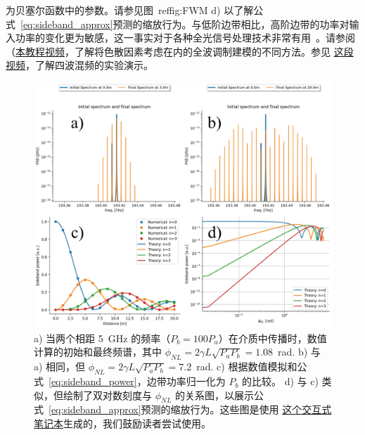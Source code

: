 为贝塞尔函数中的参数。请参见图~ref{fig:FWM} d) 以了解公式~\ref{eq:sideband_approx}预测的缩放行为。与低阶边带相比，高阶边带的功率对输入功率的变化更为敏感，这一事实对于各种全光信号处理技术非常有用~\cite{my_thesis,BenoitPhD,YangLuPhD}。请参阅（\href{https://youtu.be/0SXPvO89jto}{本教程视频}，了解将色散因素考虑在内的全波调制建模的不同方法。参见 \href{https://youtu.be/gsa9hrCbnqI}{这段视频}，了解四波混频的实验演示。
\begin{figure}
    \centering
    \includegraphics[width=1.0\linewidth]{figures/FWM_combined.png}
    \caption{a) 当两个相距 5~GHz 的频率（$P_b=100P_a$）在介质中传播时，数值计算的初始和最终频谱，其中 $\phi_{NL}=2\gamma L\sqrt{P_aP_b}=1.08$~rad. b) 与 a) 相同，但 $\phi_{NL}=2\gamma L\sqrt{P_aP_b}=7.2$~rad. c) 根据数值模拟和公式~\ref{eq:sideband_power}，边带功率归一化为 $P_b$ 的比较。 d) 与 c) 类似，但绘制了双对数刻度与 $\phi_{NL}$ 的关系图，以展示公式~\ref{eq:sideband_approx}预测的缩放行为。这些图是使用 \href{https://colab.research.google.com/drive/1l054EDg-50aK5GORN_md4_-tlFy4jwC5?usp=sharing}{这个交互式笔记本}生成的，我们鼓励读者尝试使用。   }
    \label{fig:FWM}
\end{figure} 

